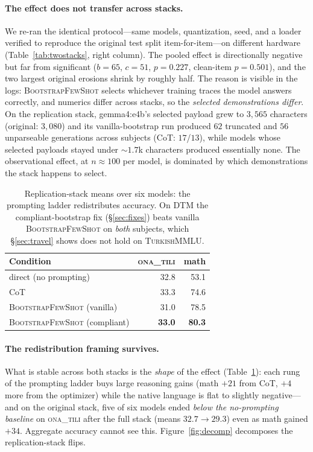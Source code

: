 \documentclass[11pt]{article}
\newcommand{\ona}{\textsc{ona\_tili}}
\newcommand{\bsfs}{\textsc{BootstrapFewShot}}
\begin{document}
\paragraph{The effect does not transfer across stacks.} We re-ran the identical
protocol---same models, quantization, seed, and a loader verified to reproduce the
original test split item-for-item---on different hardware
(Table~\ref{tab:twostacks}, right column). The pooled effect is directionally
negative but far from significant ($b{=}65$, $c{=}51$, $p{=}0.227$, clean-item
$p{=}0.501$), and the two largest original erosions shrink by roughly half. The
reason is visible in the logs: \bsfs{} selects whichever training traces the model
answers correctly, and numerics differ across stacks, so the \emph{selected
demonstrations differ}. On the replication stack, gemma4:e4b's selected payload grew
to $3{,}565$ characters (original: $3{,}080$) and its vanilla-bootstrap run produced
$62$ truncated and $56$ unparseable generations across subjects (CoT: $17$/$13$),
while models whose selected payloads stayed under ${\sim}1.7$k characters produced
essentially none. The observational effect, at $n{\approx}100$ per model, is
dominated by which demonstrations the stack happens to select.

\begin{table}[t]\centering\small
\caption{Replication-stack means over six models: the prompting ladder redistributes
accuracy. On DTM the compliant-bootstrap fix (\S\ref{sec:fixes}) beats vanilla \bsfs{}
on \emph{both} subjects, which \S\ref{sec:travel} shows does not hold on
\textsc{TurkishMMLU}.}
\label{tab:ladder}
\setlength{\tabcolsep}{5pt}
\begin{tabular}{lrr}
\toprule
Condition & \ona{} & math \\
\midrule
direct (no prompting) & 32.8 & 53.1 \\
CoT                   & 33.3 & 74.6 \\
\bsfs{} (vanilla)     & 31.0 & 78.5 \\
\bsfs{} (compliant)   & \textbf{33.0} & \textbf{80.3} \\
\bottomrule
\end{tabular}
\end{table}

\paragraph{The redistribution framing survives.} What is stable across both stacks is
the \emph{shape} of the effect (Table~\ref{tab:ladder}): each rung of the prompting
ladder buys large reasoning gains (math $+21$ from CoT, $+4$ more from the optimizer)
while the native language is flat to slightly negative---and on the original stack,
five of six models ended \emph{below the no-prompting baseline} on \ona{} after the
full stack (means $32.7{\to}29.3$) even as math gained $+34$. Aggregate accuracy
cannot see this. Figure~\ref{fig:decomp} decomposes the replication-stack flips.
\end{document}
